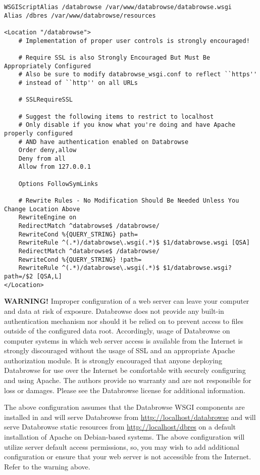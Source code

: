 \documentclass[10pt]{article}
\begin{document}
\begin{verbatim}
WSGIScriptAlias /databrowse /var/www/databrowse/databrowse.wsgi
Alias /dbres /var/www/databrowse/resources

<Location "/databrowse">
    # Implementation of proper user controls is strongly encouraged!

    # Require SSL is also Strongly Encouraged But Must Be Appropriately Configured
    # Also be sure to modify databrowse_wsgi.conf to reflect ``https'' 
    # instead of ``http'' on all URLs
    
    # SSLRequireSSL

    # Suggest the following items to restrict to localhost
    # Only disable if you know what you're doing and have Apache properly configured
    # AND have authentication enabled on Databrowse
    Order deny,allow
    Deny from all
    Allow from 127.0.0.1

    Options FollowSymLinks

    # Rewrite Rules - No Modification Should Be Needed Unless You Change Location Above
    RewriteEngine on
    RedirectMatch ^databrowse$ /databrowse/
    RewriteCond %{QUERY_STRING} path=
    RewriteRule ^(.*)/databrowse\.wsgi(.*)$ $1/databrowse.wsgi [QSA]
    RedirectMatch ^databrowse$ /databrowse/
    RewriteCond %{QUERY_STRING} !path=
    RewriteRule ^(.*)/databrowse\.wsgi(.*)$ $1/databrowse.wsgi?path=/$2 [QSA,L]
</Location>
\end{verbatim}

\textbf{WARNING!}  Improper configuration of a web server can leave your computer and data at risk of exposure.  Databrowse does not provide any built-in authentication mechanism nor should it be relied on to prevent access to files outside of the configured data root.  Accordingly, usage of Databrowse on computer systems in which web server access is available from the Internet is strongly discouraged without the usage of SSL and an appropriate Apache authorization module.  It is strongly encouraged that anyone deploying Databrowse for use over the Internet be comfortable with securely configuring and using Apache.  The authors provide no warranty and are not responsible for loss or damages.  Please see the Databrowse license for additional information.

The above configuration assumes that the Databrowse WSGI components are installed in  and will serve Databrowse from \url{http://localhost/databrowse} and will serve Databrowse static resources from \url{http://localhost/dbres} on a default installation of Apache on Debian-based systems.  The above configuration will utilize server default access permissions, so, you may wish to add additional configuration or ensure that your web server is not accessible from the Internet.  Refer to the warning above.
\end{document}
